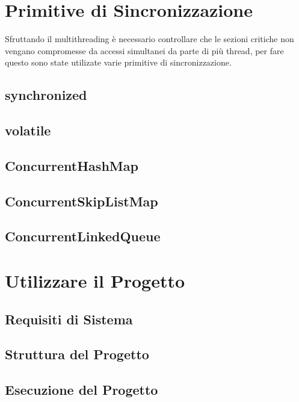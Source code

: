 \documentclass{article}
\begin{document}
\newpage

\section{Primitive di Sincronizzazione}
Sfruttando il multithreading è necessario controllare che le sezioni critiche non vengano compromesse da accessi simultanei da parte di più thread, per fare questo sono state utilizate varie primitive di sincronizzazione.
\subsection{synchronized}

\subsection{volatile}

\subsection{ConcurrentHashMap}

\subsection{ConcurrentSkipListMap}

\subsection{ConcurrentLinkedQueue}


\newpage
\section{Utilizzare il Progetto}

\subsection{Requisiti di Sistema}

\subsection{Struttura del Progetto}

\subsection{Esecuzione del Progetto}
\end{document}
